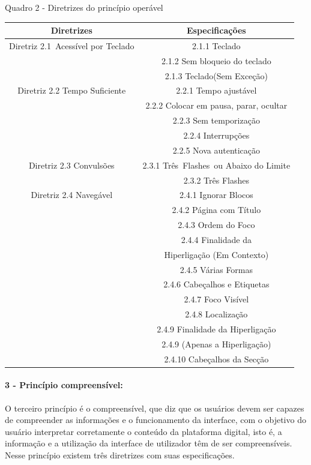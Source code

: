 \documentclass[a4paper]{article}
\begin{document}
\begin{titlepage}
Quadro 2 - Diretrizes do princípio operável\\[-1cm]
\begin{center}
	\begin{longtable}{|c|c|}
		\hline
		Diretrizes & Especificações \\
		\hline
		Diretriz 2.1 Acessível por Teclado& 2.1.1 Teclado\\
		& 2.1.2 Sem bloqueio do teclado\\
		& 2.1.3 Teclado(Sem Exceção)\\
		\hline
		Diretriz 2.2 Tempo Suficiente & 2.2.1 Tempo ajustável \\
		& 2.2.2 Colocar em pausa, parar, ocultar\\
		& 2.2.3 Sem temporização\\
		& 2.2.4 Interrupções\\
		& 2.2.5 Nova autenticação\\
		\hline
		Diretriz 2.3 Convulsões& 2.3.1 Três Flashes ou Abaixo do Limite\\
		& 2.3.2 Três Flashes\\
		\hline
		Diretriz 2.4 Navegável& 2.4.1 Ignorar Blocos\\
		& 2.4.2 Página com Título\\
		& 2.4.3 Ordem do Foco\\
		& 2.4.4 Finalidade da\\
		& Hiperligação (Em Contexto)\\
		& 2.4.5 Várias Formas\\
		& 2.4.6 Cabeçalhos e Etiquetas\\
		& 2.4.7 Foco Visível\\
		& 2.4.8 Localização\\
		& 2.4.9 Finalidade da Hiperligação\\
		& 2.4.9 (Apenas a Hiperligação)\\
		& 2.4.10 Cabeçalhos da Secção\\
		\hline
	\end{longtable}
\end{center}

\paragraph{3 - Princípio compreensível: }

O terceiro princípio é o compreensível, que diz que os usuários devem ser capazes de compreender as informações e o funcionamento da interface, com o objetivo do usuário interpretar corretamente o conteúdo da plataforma digital, isto é, a informação e a utilização da interface de utilizador têm de ser compreensíveis. Nesse princípio existem três diretrizes com suas especificações.


\end{titlepage}
\end{document}
